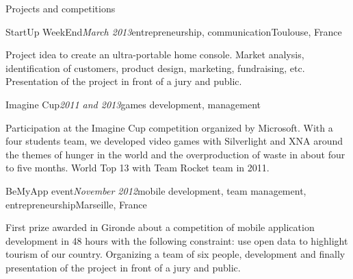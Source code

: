\begin{rSection}{Projects and competitions}
  \begin{rSubsection}{StartUp WeekEnd}{\em March 2013}{entrepreneurship, communication}{Toulouse, France}
    \item[] Project idea to create an ultra-portable home console. Market analysis, identification of customers, product design, marketing, fundraising, etc. Presentation of the project in front of a jury and public.
  \end{rSubsection}

  \begin{rSubsection}{Imagine Cup}{\em 2011 and 2013}{games development, management}{}
    \item[] Participation at the Imagine Cup competition organized by Microsoft. With a four students team, we developed video games with Silverlight and XNA around the themes of hunger in the world and the overproduction of waste in about four to five months. World Top 13 with Team Rocket team in 2011.
  \end{rSubsection}

  \begin{rSubsection}{BeMyApp event}{\em November 2012}{mobile development, team management, entrepreneurship}{Marseille, France}
    \item[] First prize awarded in Gironde about a competition of mobile application development in 48 hours with the following constraint: use open data to highlight tourism of our country. Organizing a team of six people, development and finally presentation of the project in front of a jury and public.
  \end{rSubsection}

\end{rSection}
